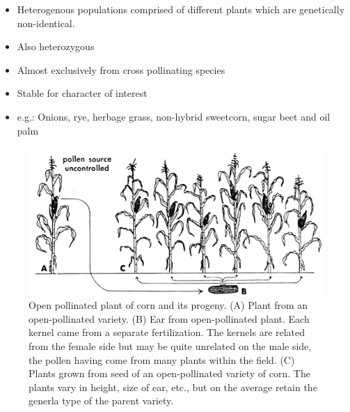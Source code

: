 \documentclass[11pt,ignorenonframetext,aspectratio=169]{beamer}
\providecommand{\tightlist}{%
  \setlength{\itemsep}{0pt}\setlength{\parskip}{0pt}}
\begin{document}
\begin{frame}{}
\protect\hypertarget{section-22}{}
\small

\begin{itemize}
\tightlist
\item
  Heterogenous populations comprised of different plants which are
  genetically non-identical.
\item
  Also heterozygous
\item
  Almost exclusively from cross pollinating species
\item
  Stable for character of interest
\item
  e.g.: Onions, rye, herbage grass, non-hybrid sweetcorn, sugar beet and
  oil palm
\end{itemize}

\begin{figure}
  \begin{columns}[T,onlytextwidth]

  \begin{center}
  \includegraphics[width=0.70\linewidth]{./images/open_pollination_corn.PNG}
  \end{center}
  
  \caption{\newline Open pollinated plant of corn and its progeny. (A) Plant from an open-pollinated variety. (B) Ear from open-pollinated plant. Each kernel came from a separate fertilization. The kernels are related from the female side but may be quite unrelated on the male side, the pollen having come from many plants within the field. (C) Plants grown from seed of an open-pollinated variety of corn. The plants vary in height, size of ear, etc., but on the average retain the generla type of the parent variety.}
  \label{fig:open-pollination-corn}
  
  \end{columns}
\end{figure}
\end{frame}
\end{document}
